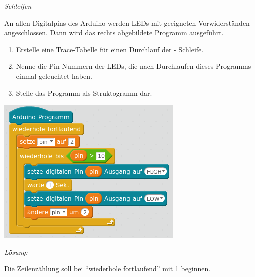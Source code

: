 \documentclass[ngerman, 11pt]{scrreprt}
\begin{document}
	\bigskip
	\begin{aufgabe} \emph{Schleifen}
		\medskip
		
		\begin{minipage}{0.6\textwidth}
			An allen Digitalpins des Arduino werden LEDs mit geeigneten Vorwiderständen angeschlossen. Dann wird das rechts abgebildete Programm ausgeführt.
			\begin{enumerate}[label=\alph*),itemsep=0mm, parsep=0mm]
				\item Erstelle eine Trace-Tabelle für einen Durchlauf der - Schleife.
				\item Nenne die Pin-Nummern der LEDs, die nach Durchlaufen dieses Programms einmal geleuchtet haben.
				\item Stelle das Programm als Struktogramm dar.
			\end{enumerate}
		\end{minipage}
		\hfill
		\begin{minipage}{0.38\textwidth}
			\centering
			\includegraphics[width=\textwidth]{../pics/programm-trace-uebung.png}
		\end{minipage}
	\end{aufgabe}
	\bigskip
	\emph{Lösung:}
	
	Die Zeilenzählung soll bei \enquote{wiederhole fortlaufend} mit 1 beginnen.
	
\end{document}
